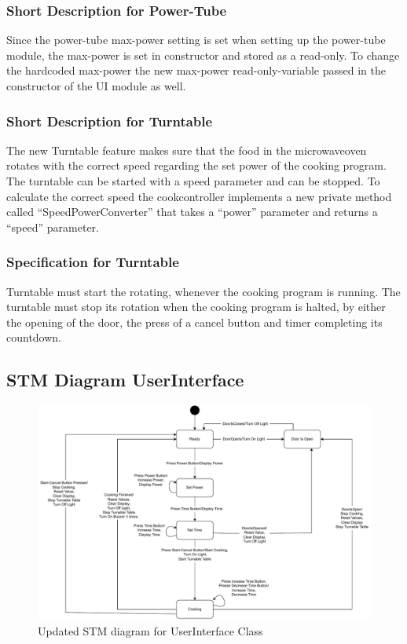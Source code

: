 \subsubsection{Short Description for Power-Tube}
Since the power-tube max-power setting is set when setting up the power-tube module, the max-power is set in constructor and stored as a read-only. To change the hardcoded max-power the new max-power read-only-variable passed in the constructor of the UI module as well.

\subsubsection{Short Description for Turntable}
The new Turntable feature makes sure that the food in the microwaveoven rotates with the correct speed regarding the set power of the cooking program. The turntable can be started with a speed parameter and can be stopped. To calculate the correct speed the cookcontroller implements a new private method called “SpeedPowerConverter” that takes a “power” parameter and returns a “speed” parameter. 

\subsubsection{Specification for Turntable}
Turntable must start the rotating, whenever the cooking program is running. The turntable must stop its rotation when the cooking program is halted, by either the opening of the door, the press of a cancel button and timer completing its countdown.

\newpage

\subsection{STM Diagram UserInterface}
\begin{figure}[h]
  \centering
  \includegraphics[scale=0.6]{02-Body/Image/STM_UserInterfacer.pdf}
  \caption{Updated STM diagram for UserInterface Class}%
  \label{fig:UserInterfaceSTM}
\end{figure}


